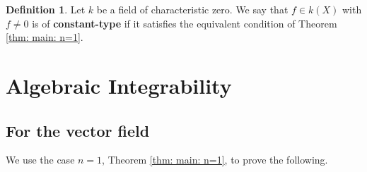 \documentclass{amsart}
\theoremstyle{definition}
\newtheorem{defin}[thm]{Definition}
\begin{document}
\begin{defin}\label{def: constant-type}
Let $k$ be a field of characteristic zero.
    We say that $f\in k(X)$ with $f\ne 0$ is of \textbf{constant-type} if it satisfies the equivalent condition of Theorem \ref{thm: main: n=1}.
\end{defin}



\section{Algebraic Integrability}

\subsection{For the vector field}

We use the case $n=1$, Theorem \ref{thm: main: n=1}, to prove the following.
\end{document}
